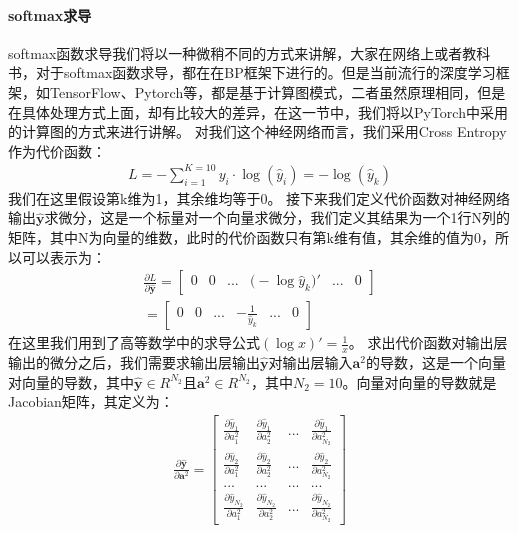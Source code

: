 \documentclass[UTF8]{article}
\begin{document}
\paragraph{softmax求导}
softmax函数求导我们将以一种微稍不同的方式来讲解，大家在网络上或者教科书，对于softmax函数求导，都在在BP框架下进行的。但是当前流行的深度学习框架，如TensorFlow、Pytorch等，都是基于计算图模式，二者虽然原理相同，但是在具体处理方式上面，却有比较大的差异，在这一节中，我们将以PyTorch中采用的计算图的方式来进行讲解。\newline
对我们这个神经网络而言，我们采用Cross Entropy作为代价函数：
\begin{equation}
\begin{aligned}
L=-\sum_{i=1}^{K=10}y_i \cdot \log{(\hat{y}_i)}=-\log{(\hat{y}_k)}
\end{aligned}
\label{mlp-mnist-loss-function-crossentropy}
\end{equation}
我们在这里假设第k维为1，其余维均等于0。\newline
接下来我们定义代价函数对神经网络输出$\hat{\boldsymbol{y}}$求微分，这是一个标量对一个向量求微分，我们定义其结果为一个1行N列的矩阵，其中N为向量的维数，此时的代价函数只有第k维有值，其余维的值为0，所以可以表示为：
\begin{equation}
\begin{aligned}
\frac{\partial{L}}{\partial{\hat{\boldsymbol{y}}}}=\begin{bmatrix}
0 & 0 & ... & \big( -\log{\hat{y}_k} \big)' & ... & 0
\end{bmatrix}\\
=\begin{bmatrix}
0 & 0 & ... & -\frac{1}{\hat{y}_k} & ... & 0
\end{bmatrix}
\end{aligned}
\label{mlp-pL-pyhat}
\end{equation}
在这里我们用到了高等数学中的求导公式$(\log x)'=\frac{1}{x}$。
求出代价函数对输出层输出的微分之后，我们需要求输出层输出$\hat{\boldsymbol{y}}$对输出层输入$\boldsymbol{a}^2$的导数，这是一个向量对向量的导数，其中$\hat{\boldsymbol{y}} \in R^{N_2}$且$\boldsymbol{a}^2 \in R^{N_2}$，其中$N_2=10$。向量对向量的导数就是Jacobian矩阵，其定义为：
\begin{equation}
\begin{aligned}
\frac{\partial{\hat{\boldsymbol{y}}}}{\partial{\boldsymbol{a}^2}}=\begin{bmatrix}
\frac{\partial{\hat{y}_1}}{\partial{a^2_1}} & \frac{\partial{\hat{y}_1}}{\partial{a^2_2}} & ... & \frac{\partial{\hat{y}_1}}{\partial{a^2_{N_2}}} \\ \frac{\partial{\hat{y}_2}}{\partial{a^2_1}} & \frac{\partial{\hat{y}_2}}{\partial{a^2_2}} & ... & \frac{\partial{\hat{y}_2}}{\partial{a^2_{N_2}}} \\
... & ... & ... & ... \\
\frac{\partial{\hat{y}_{N_2}}}{\partial{a^2_1}} & \frac{\partial{\hat{y}_{N_2}}}{\partial{a^2_2}} & ... & \frac{\partial{\hat{y}_{N_2}}}{\partial{a^2_{N_2}}}
\end{bmatrix}
\end{aligned}
\label{mlp-pyhat-pa2}
\end{equation}
\end{document}
